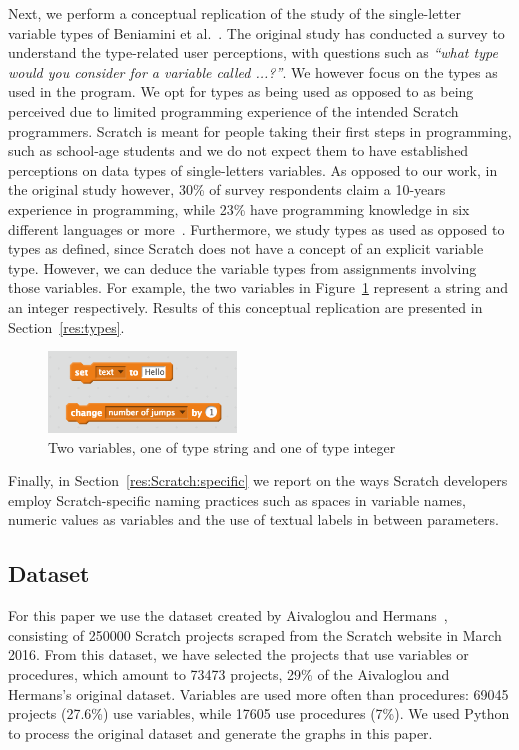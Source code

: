 \documentclass[conference]{IEEEtran}
\begin{document}
Next, we perform a conceptual replication of the study of the single-letter variable types of Beniamini et al.~\cite{Beniamini}. 
The original study has conducted a survey to understand the type-related user perceptions, with questions such as \emph{``what type would you consider for a variable called ...?''}. We however focus on the types as used in the program. 
We opt for types as being used as opposed to as being perceived due to limited programming experience of the intended Scratch programmers.
Scratch is meant for people taking their first steps in programming, such as school-age students and we do not expect them to have established  perceptions on data types of single-letters variables. 
As opposed to our work, in the original study however, 30\% of survey respondents claim a 10-years experience in programming, while  23\% have programming knowledge in six different languages or more~\cite{Beniamini}. 
Furthermore, we study types as used as opposed to types as defined, since Scratch does not have a concept of an explicit variable type.
However, we can deduce the variable types from assignments involving those variables. 
For example, the two variables in Figure~\ref{fig:types} represent a string and an integer respectively. 
Results of this conceptual replication are presented in Section~\ref{res:types}.

\begin{figure}
	\begin{center}
		\includegraphics[width=5cm]{fig/types}
		\caption{Two variables, one of type string and one of type integer}
		\label{fig:types}
	\end{center}
\end{figure} 

Finally, in Section~\ref{res:Scratch:specific} we report on the ways Scratch developers employ Scratch-specific naming practices such as spaces in variable names, numeric values as variables and the use of textual labels in between parameters.

\subsection{Dataset}
For this paper we use the dataset created by Aivaloglou and Hermans~\cite{Aivaloglou2016HowKC}, consisting of 250000 Scratch projects scraped from the Scratch website in March 2016. 
From this dataset, we have selected the projects that use variables or procedures, which amount to 73473 projects, 29\% of the Aivaloglou and Hermans's original dataset. 
Variables are used more often than procedures: 69045 projects (27.6\%) use variables, while 17605 use procedures (7\%). 
We used Python to process the original dataset and generate the graphs in this paper.
\end{document}
